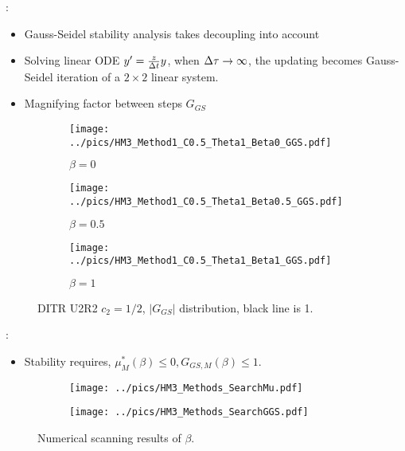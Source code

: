 \documentclass[aspectratio=169,serif]{beamer} %
\begin{document}
\begin{frame}{\secname: \subsecname}
  \begin{itemize}
    \small
    \item Gauss-Seidel stability analysis takes decoupling into account
    \item Solving linear ODE $y'=\frac{z}{{\Delta} t}y$, when ${\Delta} \tau\rightarrow\infty$, the updating becomes
          Gauss-Seidel iteration of a $2\times 2$ linear system.
    \item Magnifying factor between steps $G_{GS}$
  \end{itemize}
  \begin{figure}[htbp]
    \centering
    \begin{subfigure}{0.28\textwidth}
      \texttt{[image: ../pics/HM3\_Method1\_C0.5\_Theta1\_Beta0\_GGS.pdf]}
      \caption[]{$\beta = 0$}
    \end{subfigure}\hfill
    \begin{subfigure}{0.28\textwidth}
      \texttt{[image: ../pics/HM3\_Method1\_C0.5\_Theta1\_Beta0.5\_GGS.pdf]}
      \caption[]{$\beta = 0.5$}
    \end{subfigure}\hfill
    \begin{subfigure}{0.28\textwidth}
      \texttt{[image: ../pics/HM3\_Method1\_C0.5\_Theta1\_Beta1\_GGS.pdf]}
      \caption[]{$\beta = 1$}
    \end{subfigure}
    \caption{DITR U2R2 $c_2=1/2$, $|G_{GS}|$ distribution, black line is 1.}
    \label{fig:GGSU2R2}
  \end{figure}
\end{frame}

\begin{frame}{\secname: \subsecname}
  \footnotesize
  \begin{itemize}
    \item Stability requires, $\mu^*_{M}(\beta) \leq 0,G_{GS,M}(\beta) \leq 1$.
  \end{itemize}
  \begin{figure}[htbp]
    \centering
    \begin{subfigure}{0.45\textwidth}
      \texttt{[image: ../pics/HM3\_Methods\_SearchMu.pdf]}
    \end{subfigure}
    \begin{subfigure}{0.45\textwidth}
      \texttt{[image: ../pics/HM3\_Methods\_SearchGGS.pdf]}
    \end{subfigure}
    \caption{Numerical scanning results of $\beta$.}
    \label{fig:MuGGSSearch}
  \end{figure}
\end{frame}
\end{document}
